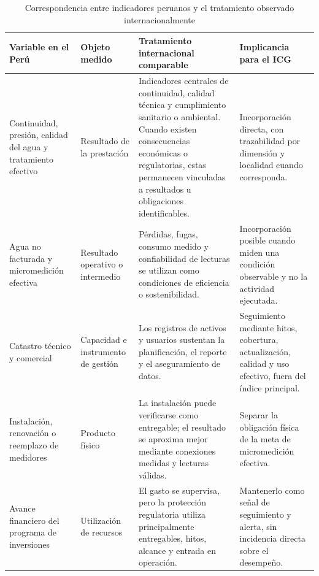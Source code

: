 \begin{table}[!t]
\centering
\caption{Correspondencia entre indicadores peruanos y el tratamiento observado internacionalmente}
\label{tab:anexo_correspondencia_peru_internacional}
\small
\renewcommand{\arraystretch}{1.16}
\setlength{\tabcolsep}{5pt}
\begin{tabularx}{\textwidth}{
>{\raggedright\arraybackslash}p{3.0cm}
>{\raggedright\arraybackslash}p{3.0cm}
>{\raggedright\arraybackslash}X
>{\raggedright\arraybackslash}p{3.35cm}}
\hline
\textbf{Variable en el Perú} &
\textbf{Objeto medido} &
\textbf{Tratamiento internacional comparable} &
\textbf{Implicancia para el ICG} \\
\hline

Continuidad, presión, calidad del agua y tratamiento efectivo
&
Resultado de la prestación
&
Indicadores centrales de continuidad, calidad técnica y cumplimiento sanitario o ambiental. Cuando existen consecuencias económicas o regulatorias, estas permanecen vinculadas a resultados u obligaciones identificables.
&
Incorporación directa, con trazabilidad por dimensión y localidad cuando corresponda.
\\

Agua no facturada y micromedición efectiva
&
Resultado operativo o intermedio
&
Pérdidas, fugas, consumo medido y confiabilidad de lecturas se utilizan como condiciones de eficiencia o sostenibilidad.
&
Incorporación posible cuando miden una condición observable y no la actividad ejecutada.
\\

Catastro técnico y comercial
&
Capacidad e instrumento de gestión
&
Los registros de activos y usuarios sustentan la planificación, el reporte y el aseguramiento de datos.
&
Seguimiento mediante hitos, cobertura, actualización, calidad y uso efectivo, fuera del índice principal.
\\

Instalación, renovación o reemplazo de medidores
&
Producto físico
&
La instalación puede verificarse como entregable; el resultado se aproxima mejor mediante conexiones medidas y lecturas válidas.
&
Separar la obligación física de la meta de micromedición efectiva.
\\

Avance financiero del programa de inversiones
&
Utilización de recursos
&
El gasto se supervisa, pero la protección regulatoria utiliza principalmente entregables, hitos, alcance y entrada en operación.
&
Mantenerlo como señal de seguimiento y alerta, sin incidencia directa sobre el desempeño.
\\


\end{tabularx}
\end{table}
